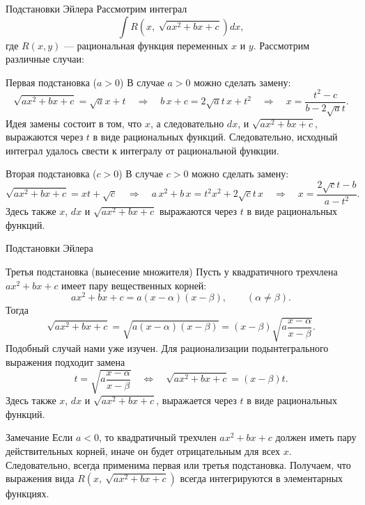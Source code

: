 \documentclass[8pt]{beamer}
\begin{document}
\begin{frame}{Подстановки Эйлера}
Рассмотрим интеграл
$$\int R\left( x,\ \sqrt{a x^2+b x+c} \right) dx,$$
где $R(x,y)$ --- рациональная функция переменных $x$ и $y$.
Рассмотрим различные случаи:
\begin{block}{Первая подстановка ($a>0$)}
В случае $a>0$ можно сделать замену:
$$\sqrt{a x^2+b x+c} = \sqrt{a} x+t \quad \Rightarrow \quad b\, x + c = 2 \sqrt{a} t\, x+t^2\quad \Rightarrow \quad x =\frac{t^2 -c}{b-2\sqrt{a} t}.$$
Идея замены состоит в том, что $x$, а следовательно $dx$, и $\sqrt{a x^2+b x+c}$, выражаются через $t$ в виде рациональных функций. Следовательно, исходный интеграл удалось свести к интегралу от рациональной функции.
\end{block}
\begin{block}{Вторая подстановка ($c>0$)}
В случае $c>0$ можно сделать замену:
$$\sqrt{a x^2+b x+c} = x t+\sqrt{c} \quad \Rightarrow \quad a\, x^2 + b\, x = t^2x^2+ 2 \sqrt{c} t\, x \quad \Rightarrow \quad x =\frac{2\sqrt{c}t-b}{a-t^2}.$$
Здесь также $x$, $dx$ и $\sqrt{a x^2+b x+c}$ выражаются через $t$ в виде рациональных функций.
\end{block}
\end{frame}

\begin{frame}{Подстановки Эйлера}
\begin{block}{Третья подстановка (вынесение множителя)}
Пусть у квадратичного трехчлена $a x^2+b x+c$ имеет пару вещественных корней:
$$a x^2+b x+c = a(x-\alpha)(x-\beta),\qquad (\alpha\ne\beta).$$
Тогда
$$ \sqrt{a x^2+b x+c} =\sqrt{a(x-\alpha)(x-\beta)}  = (x-\beta) \sqrt{ a \frac{x-\alpha}{x-\beta}}.$$
Подобный случай нами уже изучен. Для рационализации подынтегрального выражения подходит замена
$$ t = \sqrt{ a \frac{x-\alpha}{x-\beta}} \quad\Leftrightarrow \quad \sqrt{a x^2+b x+c} = (x-\beta) t.$$
Здесь также $x$, $dx$ и $\sqrt{a x^2+b x+c}$, выражается через $t$ в виде рациональных функций.
\end{block}
\begin{block}{Замечание}
Если $a<0$, то квадратичный трехчлен $a x^2+b x+c$ должен иметь пару действительных корней, иначе он будет отрицательным для всех $x$. Следовательно, всегда применима первая или третья подстановка. Получаем, что выражения вида $R\left( x,\ \sqrt{a x^2+b x+c} \right)$ всегда интегрируются в элементарных функциях.
\end{block}
\end{frame}
\end{document}
